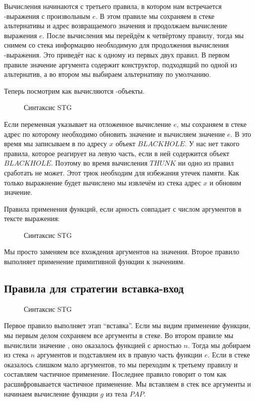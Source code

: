 Вычисления начинаются с третьего правила, в котором нам встречается
-выражения с произвольным $e$. В этом правиле мы сохраняем в
стеке альтернативы и адрес возвращаемого значения и продолжаем
вычисление выражения $e$. После вычисления мы перейдём к четвёртому
правилу, тогда мы снимем со стека информацию необходимую для продолжения
вычисления -выражения. Это приведёт нас к одному из первых двух
правил. В первом правиле значение аргумента содержит конструктор,
подходящий по одной из альтернатив, а во втором мы выбираем альтернативу
по умолчанию.

Теперь посмотрим как вычисляются -объекты.

\begin{figure}[ht]
\centering

\caption{Синтаксис STG}
\label{fig:stg-rules-thunk}
\end{figure}

Если переменная указывает на отложенное вычисление $e$, мы сохраняем в
стеке адрес по которому необходимо обновить значение и вычисляем
значение $e$. В это время мы записываем в по адресу $x$ объект
$BLACKHOLE$. У нас нет такого правила, которое реагирует на левую часть,
если в ней содержится объект $BLACKHOLE$. Поэтому во время вычисления
$THUNK$ ни одно из правил сработать не может. Этот трюк необходим для
избежания утечек памяти. Как только выражнение будет вычислено мы
извлечём из стека адрес $x$ и обновим значение.

Правила применения функций, если арность совпадает с числом аргументов в
тексте выражения:

\begin{figure}[ht]
\centering

\caption{Синтаксис STG}
\label{fig:stg-rules-apply}
\end{figure}

Мы просто заменяем все вхождения аргументов на значения. Второе правило
выполняет применение примитивной функции к значениям.

\subsection{Правила для стратегии вставка-вход}

\begin{figure}[ht]
\centering

\caption{Синтаксис STG}
\label{fig:stg-rules-push-enter}
\end{figure}

Первое правило выполняет этап ``вставка''. Если мы видим применение
функции, мы первым делом сохраняем все аргументы в стеке. Во втором
правиле мы вычислили значение , оно оказалось функцией с арностью
$n$. Тогда мы добираем из стека $n$ аргументов и подставляем их в правую
часть функции $e$. Если в стеке оказалось слишком мало аргументов, то мы
переходим к третьему правилу и составляем частичное применение.
Последнее правило говорит о том как расшифровывается частичное
применение. Мы вставляем в стек все аргументы и начинаем вычисление
функции $g$ из тела $PAP$.

